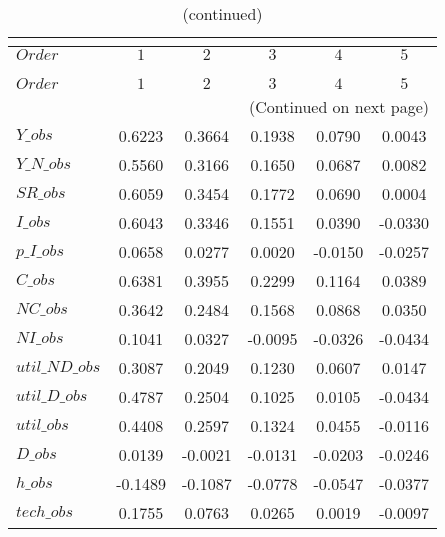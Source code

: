  
\begin{center}
\begin{longtable}{lccccc} 
\caption{COEFFICIENTS OF AUTOCORRELATION}\\
 \label{Table:th_autocorr_matrix}\\
\toprule 
$Order          $	 & 	 $          1$	 & 	 $          2$	 & 	 $          3$	 & 	 $          4$	 & 	 $          5$\\
\midrule \endfirsthead 
\caption{(continued)}\\
 \toprule \\ 
$Order          $	 & 	 $          1$	 & 	 $          2$	 & 	 $          3$	 & 	 $          4$	 & 	 $          5$\\
\midrule \endhead 
\midrule \multicolumn{6}{r}{(Continued on next page)} \\ \bottomrule \endfoot 
\bottomrule \endlastfoot 
$Y\_obs         $	 & 	     0.6223	 & 	     0.3664	 & 	     0.1938	 & 	     0.0790	 & 	     0.0043 \\ 
$Y\_N\_obs      $	 & 	     0.5560	 & 	     0.3166	 & 	     0.1650	 & 	     0.0687	 & 	     0.0082 \\ 
$SR\_obs        $	 & 	     0.6059	 & 	     0.3454	 & 	     0.1772	 & 	     0.0690	 & 	     0.0004 \\ 
$I\_obs         $	 & 	     0.6043	 & 	     0.3346	 & 	     0.1551	 & 	     0.0390	 & 	    -0.0330 \\ 
$p\_I\_obs      $	 & 	     0.0658	 & 	     0.0277	 & 	     0.0020	 & 	    -0.0150	 & 	    -0.0257 \\ 
$C\_obs         $	 & 	     0.6381	 & 	     0.3955	 & 	     0.2299	 & 	     0.1164	 & 	     0.0389 \\ 
$NC\_obs        $	 & 	     0.3642	 & 	     0.2484	 & 	     0.1568	 & 	     0.0868	 & 	     0.0350 \\ 
$NI\_obs        $	 & 	     0.1041	 & 	     0.0327	 & 	    -0.0095	 & 	    -0.0326	 & 	    -0.0434 \\ 
$util\_ND\_obs  $	 & 	     0.3087	 & 	     0.2049	 & 	     0.1230	 & 	     0.0607	 & 	     0.0147 \\ 
$util\_D\_obs   $	 & 	     0.4787	 & 	     0.2504	 & 	     0.1025	 & 	     0.0105	 & 	    -0.0434 \\ 
$util\_obs      $	 & 	     0.4408	 & 	     0.2597	 & 	     0.1324	 & 	     0.0455	 & 	    -0.0116 \\ 
$D\_obs         $	 & 	     0.0139	 & 	    -0.0021	 & 	    -0.0131	 & 	    -0.0203	 & 	    -0.0246 \\ 
$h\_obs         $	 & 	    -0.1489	 & 	    -0.1087	 & 	    -0.0778	 & 	    -0.0547	 & 	    -0.0377 \\ 
$tech\_obs      $	 & 	     0.1755	 & 	     0.0763	 & 	     0.0265	 & 	     0.0019	 & 	    -0.0097 \\ 
\end{longtable}
 \end{center}
